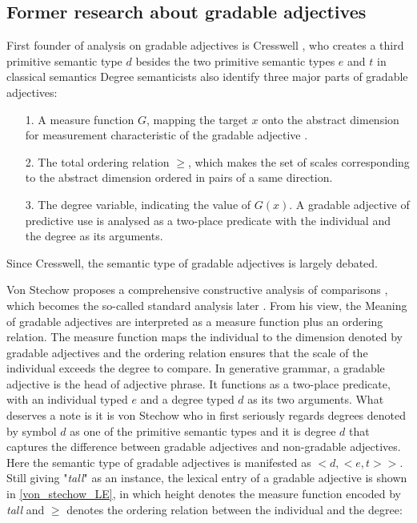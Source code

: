\documentclass{ctexart}
\let \cite \parencite
\begin{document}
\subsection{Former research about gradable adjectives}

First founder of analysis on gradable adjectives is Cresswell \cite{cresswell1976}, who creates a third primitive semantic type $d$ besides the two primitive semantic types $e$ and $t$ in classical semantics Degree semanticists also identify three major parts of gradable adjectives:

\begin{itemize}
    \item[1.] A measure function $G$, mapping the target $x$ onto the abstract dimension for measurement characteristic of the gradable adjective \cite{bartsch1974}.
    \item[2.] The total ordering relation $\geq$, which makes the set of scales corresponding to the abstract dimension ordered in pairs of a same direction.
    \item[3.] The degree variable, indicating the value of $G(x)$. A gradable adjective of predictive use is analysed as a two-place predicate with the individual and the degree as its arguments.
\end{itemize}

Since Cresswell, the semantic type of gradable adjectives is largely debated.

Von Stechow proposes a comprehensive constructive analysis of comparisons \cite{von1984a}, which becomes the so-called standard analysis later \cite{bale2011}. From his view, the Meaning of gradable adjectives are interpreted as a measure function plus an ordering relation. The measure function maps the individual to the dimension denoted by gradable adjectives and the ordering relation ensures that the scale of the individual exceeds the degree to compare. In generative grammar, a gradable adjective is the head of adjective phrase. It functions as a two-place predicate, with an individual typed $e$ and a degree typed $d$ as its two arguments. What deserves a note is it is von Stechow who in first seriously regards degrees denoted by symbol $d$ as one of the primitive semantic types and it is degree $d$ that captures the difference between gradable adjectives and non-gradable adjectives. Here the semantic type of gradable adjectives is manifested as $<d,<e,t>>$. Still giving "\textit{tall}" as an instance, the lexical entry of a gradable adjective is shown in \ref{von_stechow_LE}, in which height denotes the measure function encoded by \textit{tall} and $\geq$ denotes the ordering relation between the individual and the degree:
\end{document}
